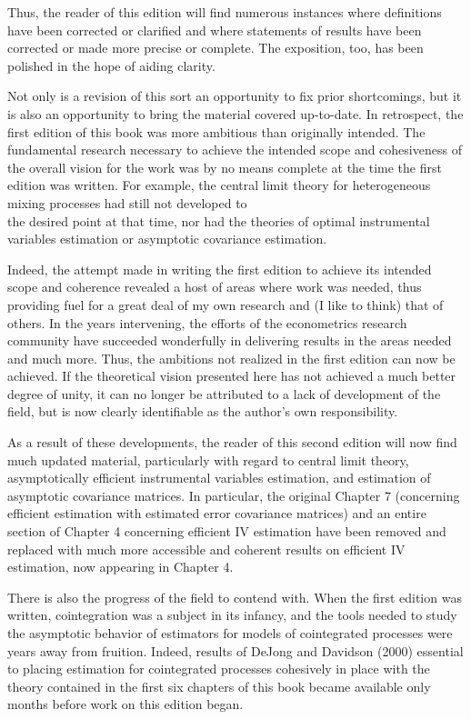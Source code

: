 \documentclass[10pt]{article}
\begin{document}
Thus, the reader of this edition will find numerous instances where definitions have been corrected or clarified and where statements of results have been corrected or made more precise or complete. The exposition, too, has been polished in the hope of aiding clarity.

Not only is a revision of this sort an opportunity to fix prior shortcomings, but it is also an opportunity to bring the material covered up-to-date. In retrospect, the first edition of this book was more ambitious than originally intended. The fundamental research necessary to achieve the intended scope and cohesiveness of the overall vision for the work was by no means complete at the time the first edition was written. For example, the central limit theory for heterogeneous mixing processes had still not developed to\\
the desired point at that time, nor had the theories of optimal instrumental variables estimation or asymptotic covariance estimation.

Indeed, the attempt made in writing the first edition to achieve its intended scope and coherence revealed a host of areas where work was needed, thus providing fuel for a great deal of my own research and (I like to think) that of others. In the years intervening, the efforts of the econometrics research community have succeeded wonderfully in delivering results in the areas needed and much more. Thus, the ambitions not realized in the first edition can now be achieved. If the theoretical vision presented here has not achieved a much better degree of unity, it can no longer be attributed to a lack of development of the field, but is now clearly identifiable as the author's own responsibility.

As a result of these developments, the reader of this second edition will now find much updated material, particularly with regard to central limit theory, asymptotically efficient instrumental variables estimation, and estimation of asymptotic covariance matrices. In particular, the original Chapter 7 (concerning efficient estimation with estimated error covariance matrices) and an entire section of Chapter 4 concerning efficient IV estimation have been removed and replaced with much more accessible and coherent results on efficient IV estimation, now appearing in Chapter 4.

There is also the progress of the field to contend with. When the first edition was written, cointegration was a subject in its infancy, and the tools needed to study the asymptotic behavior of estimators for models of cointegrated processes were years away from fruition. Indeed, results of DeJong and Davidson (2000) essential to placing estimation for cointegrated processes cohesively in place with the theory contained in the first six chapters of this book became available only months before work on this edition began.
\end{document}
